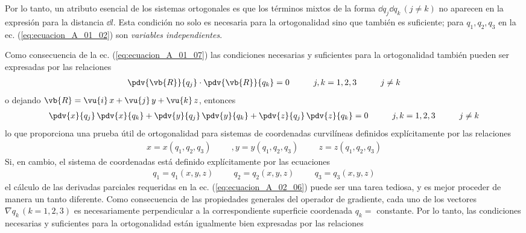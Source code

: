 Por lo tanto, un atributo esencial de los sistemas ortogonales es que los términos mixtos de la forma $\dd{q}_{j} \dd{q}_{k} \, (j \neq k)$ no aparecen en la expresión para la distancia $\dd{l}$. Esta condición no solo es necesaria para la ortogonalidad sino que también es suficiente; para $q_{1}, q_{2}, q_{3}$ en la ec. (\ref{eq:ecuacion_A_01_02}) son \emph{variables independientes}.
\par
Como consecuencia de la ec. (\ref{eq:ecuacion_A_01_07}) las condiciones necesarias y suficientes para la ortogonalidad también pueden ser expresadas por las relaciones
\begin{align}
\pdv{\vb{R}}{q_{j}} \cdot \pdv{\vb{R}}{q_{k}} = 0 \hspace{1cm} j, k = 1, 2, 3 \hspace{1cm} j \neq k
\label{eq:ecuacion_A_02_05}    
\end{align}
o dejando $\vb{R} = \vu{i} \, x + \vu{j} \, y + \vu{k} \, z$, entonces
\begin{align}
\pdv{x}{q_{j}} \, \pdv{x}{q_{k}} + \pdv{y}{q_{j}} \, \pdv{y}{q_{k}} + \pdv{z}{q_{j}} \, \pdv{z}{q_{k}} = 0 \hspace{1cm} j, k = 1, 2, 3 \hspace{1cm} j \neq k
\label{eq:ecuacion_A_02_06}
\end{align}
lo que proporciona una prueba útil de ortogonalidad para sistemas de coordenadas curvilíneas definidos explícitamente por las relaciones
\begin{align*}
x = x (q_{1}, q_{2}, q_{3}) \hspace{1cm}, y = y (q_{1}, q_{2}, q_{3}) \hspace{1cm} z = z (q_{1}, q_{2}, q_{3})
\end{align*}
Si, en cambio, el sistema de coordenadas está definido explícitamente por las ecuaciones
\begin{align*}
q_{1} = q_{1} (x, y , z) \hspace{1cm} q_{2} = q_{2} (x, y , z) \hspace{1cm} q_{3} = q_{3} (x, y , z)
\end{align*}
el cálculo de las derivadas parciales requeridas en la ec. (\ref{eq:ecuacion_A_02_06}) puede ser una tarea tediosa, y es mejor proceder de manera un tanto diferente. Como consecuencia de las propiedades generales del operador de gradiente, cada uno de los vectores $\nabla q_{k} \, (k = 1,2,3)$ es necesariamente perpendicular a la correspondiente superficie coordenada $q_{k} =$ constante. Por lo tanto, las condiciones necesarias y suficientes para la ortogonalidad están igualmente bien expresadas por las relaciones

